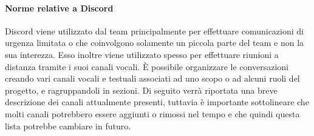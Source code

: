 \paragraph{Norme relative a Discord}\Spazio
 Discord viene utilizzato dal team principalmente per effettuare comunicazioni di urgenza limitata o che coinvolgono solamente un piccola parte del team e non la sua interezza. Esso inoltre viene utilizzato spesso per effettuare riunioni a distanza tramite i suoi canali vocali. 
 È possibile organizzare le conversazioni creando vari canali vocali e testuali associati ad uno scopo o ad alcuni ruoli del progetto, e ragruppandoli in sezioni. Di seguito verrà riportata una breve descrizione dei canali attualmente presenti, tuttavia è importante sottolineare che molti canali potrebbero essere aggiunti o rimossi nel tempo e che quindi questa lista potrebbe cambiare in futuro.\newline
